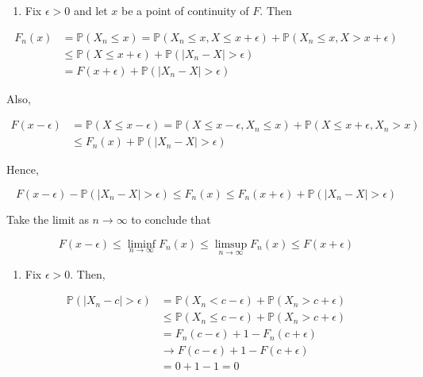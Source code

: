 \begin{enumerate}[tightlist,label={\arabic*.}]
\item
  Fix \(\epsilon > 0\) and let \(x\) be a point of continuity of \(F\).
  Then
\end{enumerate}

\begin{align*}
F_{n}(x) & = \mathbb{P}(X_{n} \leq x) = \mathbb{P}(X_{n} \leq x, X \leq x + \epsilon) + \mathbb{P}(X_{n} \leq x, X > x + \epsilon) \\
       & \leq \mathbb{P}(X \leq x + \epsilon) + \mathbb{P}(|X_{n} - X| > \epsilon) \\
       & = F(x + \epsilon) + \mathbb{P}(|X_{n} - X| > \epsilon)
\end{align*}

Also,

\begin{align*}
F(x - \epsilon) & = \mathbb{P}(X \leq x - \epsilon) = \mathbb{P}(X \leq x - \epsilon, X_{n} \leq x) + \mathbb{P}(X \leq x + \epsilon, X_{n} > x) \\
                & \leq F_{n}(x) + \mathbb{P}(|X_{n} - X| > \epsilon)
\end{align*}

Hence,

\[ F(x - \epsilon) - \mathbb{P}(|X_{n} - X| > \epsilon) \leq F_{n}(x) \leq F_{n}(x + \epsilon) + \mathbb{P}(|X_{n} - X| > \epsilon) \]

Take the limit as \(n \rightarrow \infty\) to conclude that

\[ F(x - \epsilon) \leq \liminf_{n \rightarrow \infty} F_{n}(x) \leq \limsup_{n \rightarrow \infty} F_{n}(x) \leq F(x + \epsilon) \]

\begin{enumerate}[tightlist,label={\arabic*.},resume]
\item
  Fix \(\epsilon > 0\). Then,
\end{enumerate}

\begin{align*}
\mathbb{P}(|X_{n} - c| > \epsilon) & = \mathbb{P}(X_{n} < c - \epsilon) + \mathbb{P}(X_{n} > c + \epsilon) \\
                                 & \leq \mathbb{P}(X_{n} \leq c - \epsilon) + \mathbb{P}(X_{n} > c + \epsilon) \\
                                 & = F_{n}(c - \epsilon) + 1 - F_{n}(c + \epsilon) \\
                                 & \rightarrow F(c - \epsilon) + 1 - F(c + \epsilon) \\
                                 & = 0 + 1 - 1 = 0
\end{align*}

